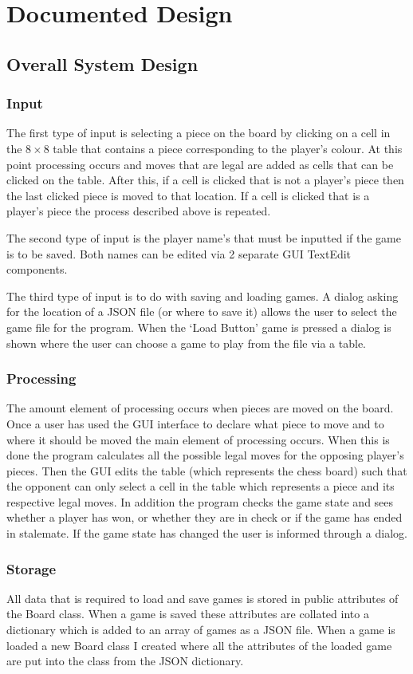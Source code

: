 \chapter{Documented Design}
\section{Overall System Design}
\subsection{Input}
The first type of input is selecting a piece on the board by clicking on a cell in the $ 8\times8 $ table that contains a piece corresponding to the player's colour. At this point processing occurs and moves that are legal are added as cells that can be clicked on the table. After this, if a cell is clicked that is not a player's piece then the last clicked piece is moved to that location. If a cell is clicked that is a player's piece the process described above is repeated.

The second type of input is the player name's that must be inputted if the game is to be saved. Both names can be edited via 2 separate GUI TextEdit components. 

The third type of input is to do with saving and loading games. A dialog asking for the location of a JSON file (or where to save it) allows the user to select the game file for the program. When the ‘Load Button' game is pressed a dialog is shown where the user can choose a game to play from the file via a table.
\subsection{Processing}
The amount element of processing occurs when pieces are moved on the board. Once a user has used the GUI interface to declare what piece to move and to where it should be moved the main element of processing occurs. When this is done the program calculates all the possible legal moves for the opposing player's pieces. Then the GUI edits the table (which represents the chess board) such that the opponent can only select a cell in the table which represents a piece and its respective legal moves. In addition the program checks the game state and sees whether a player has won, or whether they are in check or if the game has ended in stalemate. If the game state has changed the user is informed through a dialog. 
\subsection{Storage}
All data that is required to load and save games is stored in public attributes of the Board class. When a game is saved these attributes are collated into a dictionary which is added to an array of games as a JSON file. When a game is loaded a new Board class I created where all the attributes of the loaded game are put into the class from the JSON dictionary.
